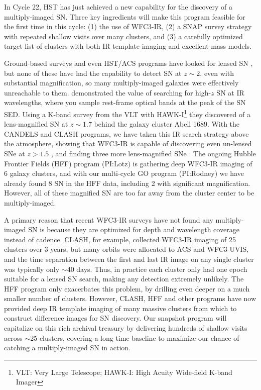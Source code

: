    

In Cycle 22, HST has just achieved a new capability for the discovery
of a multiply-imaged SN. Three key ingredients will make this program
feasible for the first time in this cycle: (1) the use of
WFC3-IR, (2) a SNAP survey strategy
with repeated shallow visits over many clusters, and (3) a carefully
optimized target list of clusters with both IR template imaging
and excellent mass models.

 Ground-based surveys and even HST/ACS programs
have looked for lensed
SN \citep[e.g.][]{Sharon:2007,Dawson:2009,Sharon:2010,Sand:2011}, but
none of these have had the capability to detect SN at $z\sim2$, even
with substantial magnification, so many multiply-imaged
galaxies were effectively unreachable to them.
\citet{Amanullah:2011} 
demonstrated the value of searching for high-$z$ SN at IR wavelengths,
where you sample rest-frame optical bands at the peak of the SN
SED. Using a K-band survey from the VLT with HAWK-I\footnote{VLT: Very
Large Telescope; HAWK-I: High Acuity Wide-field K-band Imager} they
discovered of a lens-magnified SN at $z\sim1.7$ behind the galaxy
cluster Abell 1689.  With the CANDELS and CLASH programs, we have
taken this IR search strategy above the atmosphere, showing that
WFC3-IR is capable of discovering even un-lensed SNe at
$z>1.5$ \citep{Rodney:2012,Jones:2013}, and finding three more
lens-magnified SNe \citep{Patel:2013,Nordin:2014}.  The ongoing Hubble
Frontier Fields (HFF) program (PI:Lotz) is gathering deep WFC3-IR
imaging of 6 galaxy clusters, and with our multi-cycle GO program
(PI:Rodney) we have already found 8 SN in the HFF data, including 2
with significant magnification.  However, all of these magnified SN
are too far away from the cluster center to be multiply-imaged. 

 A primary reason that
recent WFC3-IR surveys have not found any multiply-imaged SN is
because they are optimized for depth and wavelength coverage instead
of cadence.  CLASH, for example, collected WFC3-IR imaging of 25
clusters over 3 years, but many orbits were allocated to ACS and
WFC3-UVIS, and the time separation between the first and last IR image
on any single cluster was typically only $\sim$40 days.  Thus, in
practice each cluster only had one epoch suitable for a lensed SN
search, making any detection extremely unlikely.  The HFF program only
exacerbates this problem, by drilling even deeper on a much smaller
number of clusters.  However, CLASH, HFF and other programs have now
provided deep IR template imaging of many massive clusters from which
to construct difference images for SN discovery.  Our snapshot program
will capitalize on this rich archival treasury by delivering hundreds
of shallow visits across $\sim$25 clusters, covering a long time
baseline to maximize our chance of catching a multiply-imaged SN in
action.

